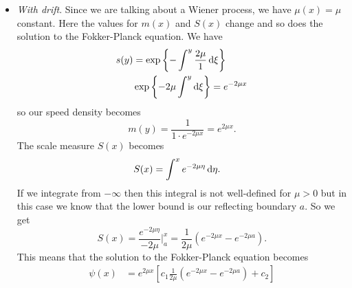 \documentclass[12pt]{article}
\begin{document}
\begin{enumerate}
\begin{itemize}
\begin{equation*}
\begin{cases}
					\psi(x)\geq0\\
					\int_{I}\psi(x)\dx=1.
				\end{cases}
			\end{equation*}
		For the conditions of non-negativity to hold, we try setting $c_{1}=0\implies\psi(x)=c_{2}$.
		Knowing that the Wiener process between two reflecting boundaries $a$ and $b$ has diffusion interval $I=(a,b)$, the total probability condition becomes
		\begin{align*}
			&\int_{I}\psi(x)\dx=1\\
			\implies&\int_{a}^{b}c_{2}\dx=1\\
			\implies&c_{2}(b-a)=1\\
			\implies& c_{2}=\frac{1}{b-a}.
		\end{align*}
		So what we get is 
		\begin{equation*}
			\psi(x)=\frac{1}{b-a}\qquad x\in[a,b]
		\end{equation*}
		which is exactly the uniform distribution we were looking for.
		\item \emph{With drift}. Since we are talking about a Wiener process, we have $\mu(x)=\mu$ constant. Here the values for $m(x)$ and $S(x)$ change and so does the solution to the Fokker-Planck equation. We have
		\begin{align*}
			s(y)&=\exp\left\{-\int^{y}\frac{2\mu}{1}\mathop{}\!\mathrm{d}\xi\right\}\\
			&\exp\left\{-2\mu\int^{y}\mathop{}\!\mathrm{d}\xi\right\}=e^{-2\mu x}
		\end{align*}
		so our speed density becomes
		\begin{equation*}
			m(y)=\frac{1}{1\cdot e^{-2\mu x}}=e^{2\mu x}.
		\end{equation*}
		The scale measure $S(x)$ becomes
		\begin{align*}
			S(x)&=\int^{x}e^{-2\mu\eta}\mathop{}\!\mathrm{d}\eta.
		\end{align*}
		If we integrate from $-\infty$ then this integral is not well-defined for $\mu>0$ but in this case we know that the lower bound is our reflecting boundary $a$. So we get
		\begin{equation*}
			S(x)=\frac{e^{-2\mu\eta}}{-2\mu}\bigg|_{a}^{x}=\frac{1}{2\mu}\left(e^{-2\mu x}-e^{-2\mu a}\right).
		\end{equation*}
		This means that the solution to the Fokker-Planck equation becomes
		\begin{align*}
			\psi(x)&=e^{2\mu x}\left[c_{1}\frac{1}{2\mu}\left(e^{-2\mu x}-e^{-2\mu a}\right)+c_{2}\right]\\

\end{align*}
\end{itemize}
\end{enumerate}
\end{document}
